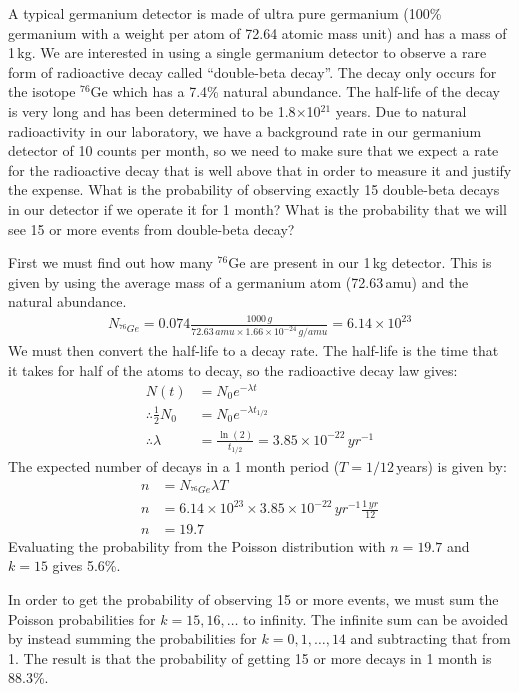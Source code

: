\begin{example}{}{A typical germanium detector is made of ultra pure germanium (100\% germanium with a weight per atom of 72.64 atomic mass unit) and has a mass of 1\,kg. We are interested in using a single germanium detector to observe a rare form of radioactive decay called ``double-beta decay''. The decay only occurs for the isotope $^{76}$Ge which has a 7.4\% natural abundance. The half-life of the decay is very long and has been determined to be 1.8$\times$10$^{21}$ years. Due to natural radioactivity in our laboratory, we have a background rate in our germanium detector of 10 counts per month, so we need to make sure that we expect a rate for the radioactive decay that is well above that in order to measure it and justify the expense. What is the probability of observing exactly 15 double-beta decays in our detector if we operate it for 1 month? What is the probability that we will see 15 or more events from double-beta decay?}{}

First we must find out how many $^{76}$Ge are present in our 1\,kg detector. This is given by using the average mass of a germanium atom (72.63\,amu) and the natural abundance. 
\begin{align*}
N_{^{76}Ge}=0.074\frac{1000\,g}{72.63\,amu\times1.66\times10^{-24}\,g/amu}=6.14\times10^{23}
\end{align*}
We must then convert the half-life to a decay rate. The half-life is the time that it takes for half of the atoms to decay, so the radioactive decay law gives:
\begin{align*}
N(t)&=N_0e^{-\lambda t}\\
\therefore \frac{1}{2}N_0&=N_0e^{-\lambda t_{1/2}}\\
\therefore \lambda&=\frac{\ln(2)}{t_{1/2}}=3.85\times 10^{-22}\,yr^{-1}
\end{align*}
The expected number of decays in a 1 month period ($T=1/12$\,years) is given by:
\begin{align*}
n&=N_{^{76}Ge}\lambda T\\
n&=6.14\times10^{23}\times3.85\times 10^{-22}\,yr^{-1}\frac{1\,yr}{12}\\
n&=19.7
\end{align*}
Evaluating the probability from the Poisson distribution with $n=19.7$ and $k=15$ gives 5.6\%.

In order to get the probability of observing 15 or more events, we must sum the Poisson probabilities for $k=15,16,\dots$ to infinity. The infinite sum can be avoided by instead summing the probabilities for $k=0,1,\dots,14$ and subtracting that from 1. The result is that the probability of getting 15 or more decays in 1 month is 88.3\%.


\end{example}
